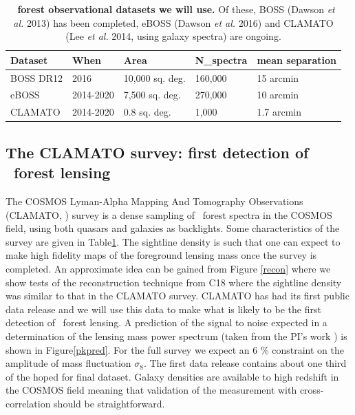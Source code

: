 \begin{table}[h]
\begin{tabular}{|l|l|l|l|l|}
\hline
Dataset   & When      & Area            & N_{\rm spectra} & mean separation \\ \hline
BOSS DR12 & 2016      & 10,000 sq. deg. & 160,000            & 15 arcmin       \\
eBOSS     & 2014-2020 & 7,500 sq. deg.  & 270,000            & 10 arcmin       \\
CLAMATO   & 2014-2020 & 0.8 sq. deg.    & 1,000              & 1.7 arcmin      \\
\hline
\end{tabular}
\centering
\caption{ \footnotesize
{\bf \lya\ forest observational
datasets we will use.} 
Of these, BOSS (Dawson {\it et al.} 2013) has been completed,
eBOSS (Dawson {\it et al.} 2016) and CLAMATO (Lee {\it et al.} 2014, using
galaxy spectra) are ongoing. }
\label{obs}
\end{table}



\subsection{The CLAMATO survey: first detection of \lya\ forest lensing}

The COSMOS Lyman-Alpha Mapping And Tomography Observations (CLAMATO,
\cite{clamato})
 survey is a dense sampling of \lya\ forest spectra in the
COSMOS field, using both quasars and galaxies as backlights.
Some characteristics of the survey are given in Table\ref{obs}. The
sightline density is such that one can expect to make high
fidelity maps of the foreground lensing mass once the survey is completed.
An approximate idea can be gained from Figure \ref{recon} where we show
tests of the reconstruction technique from C18 where the sightline
density was similar to that in the CLAMATO survey. 
CLAMATO has had its first public data release \cite{clamato} and
we will use this data to make what is likely to be the first 
detection of \lya\ forest lensing. A prediction of the 
signal to noise expected in a determination of the lensing mass power spectrum
(taken from the PI's work 
\cite{metcalfandcroft}) is shown in Figure\ref{pkpred}. For
the full survey we expect an 6 \%  constraint on the amplitude
of mass fluctuation $\sigma_{8}$. The first data release contains about
one third of the hoped for final dataset. Galaxy densities are available
to high redshift in the COSMOS field meaning that validation of the
measurement with cross-correlation should be straightforward.

